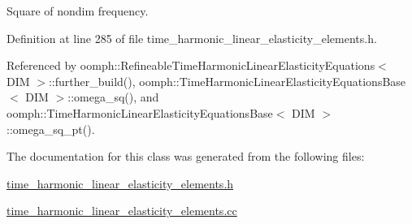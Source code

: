 Square of nondim frequency. 



Definition at line 285 of file time\+\_\+harmonic\+\_\+linear\+\_\+elasticity\+\_\+elements.\+h.



Referenced by oomph\+::\+Refineable\+Time\+Harmonic\+Linear\+Elasticity\+Equations$<$ D\+I\+M $>$\+::further\+\_\+build(), oomph\+::\+Time\+Harmonic\+Linear\+Elasticity\+Equations\+Base$<$ D\+I\+M $>$\+::omega\+\_\+sq(), and oomph\+::\+Time\+Harmonic\+Linear\+Elasticity\+Equations\+Base$<$ D\+I\+M $>$\+::omega\+\_\+sq\+\_\+pt().



The documentation for this class was generated from the following files\+:\begin{DoxyCompactItemize}
\item 
\hyperlink{time__harmonic__linear__elasticity__elements_8h}{time\+\_\+harmonic\+\_\+linear\+\_\+elasticity\+\_\+elements.\+h}\item 
\hyperlink{time__harmonic__linear__elasticity__elements_8cc}{time\+\_\+harmonic\+\_\+linear\+\_\+elasticity\+\_\+elements.\+cc}\end{DoxyCompactItemize}

